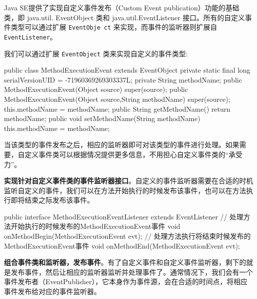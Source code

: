 Java SE提供了实现自定义事件发布（Custom Event publication）功能的基础类，即 java.util. EventObject 类和 java.util.EventListener 接口。所有的自定义事件类型可以通过扩展 \texttt{EventObje ct} 来实现，而事件的监听器则扩展自 \texttt{EventListener}。

我们可以通过扩展 \texttt{EventObject} 类来实现自定义的事件类型:

\begin{Java}
public class MethodExecutionEvent extends EventObject {   
    private static final long serialVersionUID = -71960369269303337L;   
    private String methodName;   
    public MethodExecutionEvent(Object source) {     
        super(source);    
    }    
    public MethodExecutionEvent(Object source,String methodName)   {      
        super(source);      
        this.methodName = methodName;   
    }    
    public String getMethodName() {     
        return  methodName;    
    }    
    public void setMethodName(String methodName) {     
        this.methodName = methodName;   
    }  
}
\end{Java}

当该类型的事件发布之后，相应的监听器即可对该类型的事件进行处理。如果需要，自定义事件类可以根据情况提供更多信息，不用担心自定义事件类的“承受力”。

\textbf{实现针对自定义事件类的事件监听器接口}。自定义的事件监听器需要在合适的时机监听自定义的事件，我们可以在方法开始执行的时候发布该事件，也可以在方法执行即将结束之际发布该事件。

\begin{Java}
public interface MethodExecutionEventListener extends EventListener {   
    // 处理方法开始执行的时候发布的MethodExecutionEvent事件   
    void onMethodBegin(MethodExecutionEvent evt);   
    // 处理方法执行将结束时候发布的MethodExecutionEvent事件  
    void onMethodEnd(MethodExecutionEvent evt);
}
\end{Java}

\textbf{组合事件类和监听器，发布事件}。有了自定义事件和自定义事件监听器，剩下的就是发布事件，然后让相应的监听器监听并处理事件了。通常情况下，我们会有一个事件发布者（EventPublisher），它本身作为事件源，会在合适的时间点，将相应事件发布给对应的事件监听器。

